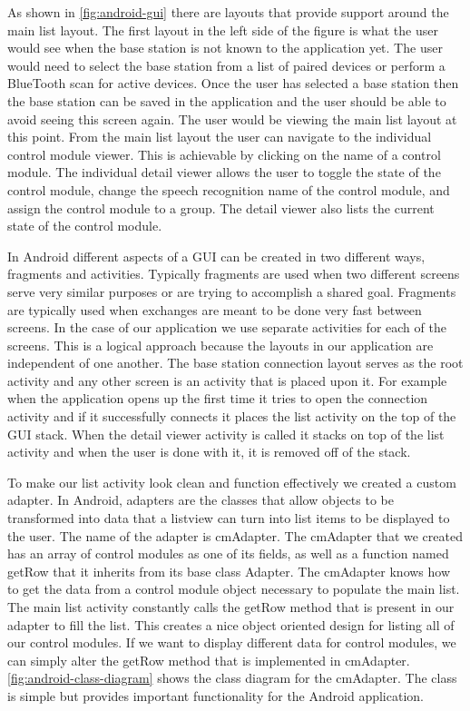 As shown in \autoref{fig:android-gui} there are layouts that provide support
around the main list layout. The first layout in the left side of the figure is what the user would see when the base station is not known to
the application yet. The user would need to select the base station from a list
of paired devices or perform a BlueTooth scan for active devices. Once the user
has selected a base station then the base station can be saved in the
application and the user should be able to avoid seeing this screen again.
The user would be viewing the main list layout at this point. From the main
list layout the user can navigate to the individual control module viewer. This 
is achievable by clicking on the name of a control module. The individual detail viewer allows the user to toggle the
state of the control module, change the speech recognition name of the control
module, and assign the control module to a group. The detail viewer also
lists the current state of the control module.

In Android different aspects of a GUI can be created in two different ways,
fragments and activities. Typically fragments are used when two different
screens serve very similar purposes or are trying to accomplish a shared goal.
Fragments are typically used when exchanges are meant to be done very fast
between screens. In the case of our application we use separate
activities for each of the screens. This is a logical approach because the
layouts in our application are independent of one another. The base station connection layout  
serves as the root activity and any other screen is an activity that
is placed upon it. For example when the application opens up the first time it
tries to open the connection activity and if it successfully connects it places the list activity on the top of the GUI stack. When the detail viewer activity is called
it stacks on top of the list activity and when the user is done with it, it
is removed off of the stack.

To make our list activity look clean and function effectively we created a
custom adapter. In Android, adapters are the classes that allow objects to be
transformed into data that a listview can turn into list items to be displayed
to the user. The name of the adapter is cmAdapter. The cmAdapter that we
created has an array of control modules as one of its fields, as well as a
function named getRow that it inherits from its base class Adapter. The
cmAdapter knows how to get the data from a control module object necessary
to populate the main list. The main list activity constantly calls the
getRow method that is present in our adapter to fill the list. This
creates a nice object oriented design for listing all of our control modules.
If we want to display different data for control modules, we can simply alter
the getRow method that is implemented in cmAdapter.
\autoref{fig:android-class-diagram} shows the class diagram for the cmAdapter.
The class is simple but provides important functionality for the Android
application.

